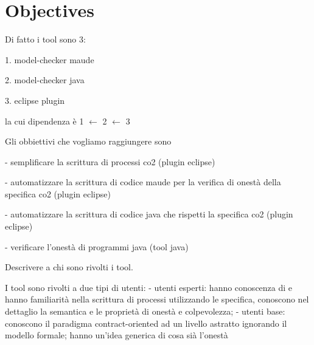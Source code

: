 \section{Objectives}
 Di fatto i tool sono 3:
 
 1. model-checker maude
 
 2. model-checker java
 
 3. eclipse plugin

 la cui dipendenza è 1 $\longleftarrow$ 2 $\longleftarrow$ 3
 
 Gli obbiettivi che vogliamo raggiungere sono
 
 - semplificare la scrittura di processi co2 (plugin eclipse)
 
 - automatizzare la scrittura di codice maude per la verifica di onestà della specifica co2 (plugin eclipse)
 
 - automatizzare la scrittura di codice java che rispetti la specifica co2 (plugin eclipse)
 
 - verificare l'onestà di programmi java (tool java)

 Descrivere a chi sono rivolti i tool.


I tool sono rivolti a due tipi di utenti:
- utenti esperti: hanno conoscenza di \coco e hanno familiarità nella scrittura
di processi utilizzando le specifica, conoscono nel dettaglio la semantica e le
proprietà di onestà e colpevolezza;
- utenti base: conoscono il paradigma contract-oriented ad un livello astratto 
ignorando il modello formale; hanno un'idea generica di cosa sià l'onestà

